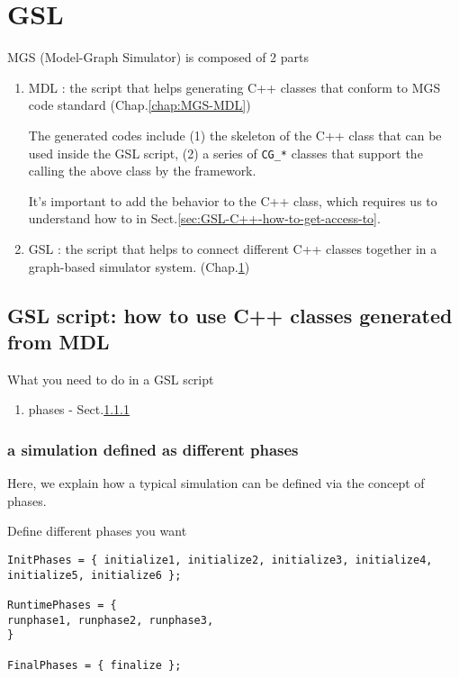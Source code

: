 \chapter{GSL}
\label{chap:MGS-GSL}

MGS (Model-Graph Simulator) is composed of 2 parts
\begin{enumerate}
  \item MDL : the script that helps generating C++ classes that conform to MGS
  code standard (Chap.\ref{chap:MGS-MDL})

The generated codes include
(1) the skeleton of the C++ class that can be used inside the GSL script, (2) a
series of \verb!CG_*! classes that support the calling the above class by the
framework.

It's important to add the behavior to the C++ class, which requires us to
understand how to in Sect.\ref{sec:GSL-C++-how-to-get-access-to}.

  
  \item GSL : the script that helps to connect different C++ classes together in
  a graph-based simulator system. (Chap.\ref{chap:MGS-GSL})
\end{enumerate}


\section{GSL script: how to use C++ classes generated from MDL}
\label{sec:GSL-script}

What you need to do in a GSL script
\begin{enumerate}
  \item phases - Sect.\ref{sec:MGS-GSL-phases}
\end{enumerate}

\subsection{a simulation defined as different phases}
\label{sec:MGS-GSL-phases}

Here, we explain how a typical simulation can be defined
via the concept of phases.

Define different phases you want 
\begin{verbatim}
InitPhases = { initialize1, initialize2, initialize3, initialize4, initialize5, initialize6 };

RuntimePhases = {
runphase1, runphase2, runphase3,
}

FinalPhases = { finalize };
\end{verbatim}

